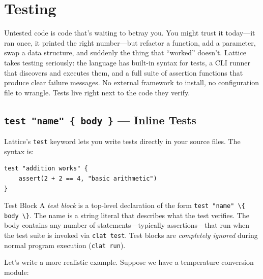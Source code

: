 \chapter{Testing}\label{ch:testing}


Untested code is code that's waiting to betray you.
You might trust it today---it ran once, it printed the right number---but refactor a function, add a parameter, swap a data structure, and suddenly the thing that ``worked'' doesn't.
Lattice takes testing seriously: the language has built-in syntax for tests, a CLI runner that discovers and executes them, and a full suite of assertion functions that produce clear failure messages.
No external framework to install, no configuration file to wrangle.
Tests live right next to the code they verify.

\section{\texttt{test "name" \{ body \}} --- Inline Tests}\label{sec:inline-tests}

Lattice's \lstinline|test| keyword lets you write tests directly in your source files.
The syntax is:

\begin{lstlisting}[language=Lattice, caption={Basic test block syntax}]
test "addition works" {
    assert(2 + 2 == 4, "basic arithmetic")
}
\end{lstlisting}

\begin{defnbox}{Test Block}
A \emph{test block} is a top-level declaration of the form \lstinline|test "name" \{ body \}|.
The name is a string literal that describes what the test verifies.
The body contains any number of statements---typically assertions---that run when the test suite is invoked via \lstinline|clat test|.
Test blocks are \emph{completely ignored} during normal program execution (\lstinline|clat run|).
\end{defnbox}

Let's write a more realistic example.
Suppose we have a temperature conversion module:

